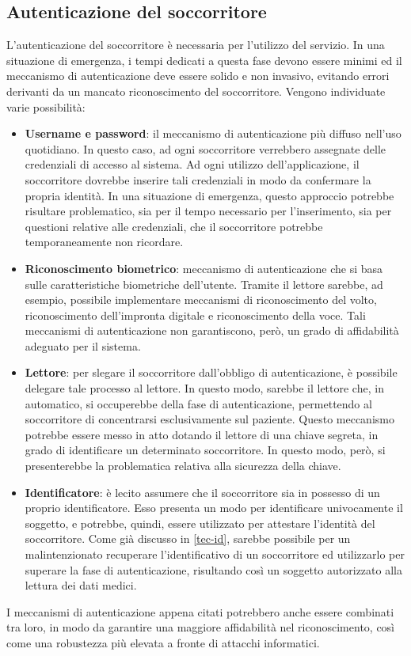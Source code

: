 \documentclass[a4paper,12pt]{report}
\begin{document}
\subsection{Autenticazione del soccorritore}
L'autenticazione del soccorritore è necessaria per l'utilizzo del servizio. In una situazione di emergenza, i tempi dedicati a questa fase devono essere minimi ed il meccanismo di autenticazione deve essere solido e non invasivo, evitando errori derivanti da un mancato riconoscimento del soccorritore. Vengono individuate varie possibilità:
\begin{itemize}
	\item \textbf{Username e password}: il meccanismo di autenticazione più diffuso nell'uso quotidiano. In questo caso, ad ogni soccorritore verrebbero assegnate delle credenziali di accesso al sistema. Ad ogni utilizzo dell'applicazione, il soccorritore dovrebbe inserire tali credenziali in modo da confermare la propria identità. In una situazione di emergenza, questo approccio potrebbe risultare problematico, sia per il tempo necessario per l'inserimento, sia per questioni relative alle credenziali, che il soccorritore potrebbe temporaneamente non ricordare.
	\item \textbf{Riconoscimento biometrico}: meccanismo di autenticazione che si basa sulle caratteristiche biometriche dell'utente. Tramite il lettore sarebbe, ad esempio, possibile implementare meccanismi di riconoscimento del volto, riconoscimento dell'impronta digitale e riconoscimento della voce. Tali meccanismi di autenticazione non garantiscono, però, un grado di affidabilità adeguato per il sistema.
	\item \textbf{Lettore}: per slegare il soccorritore dall'obbligo di autenticazione, è possibile delegare tale processo al lettore. In questo modo, sarebbe il lettore che, in automatico, si occuperebbe della fase di autenticazione, permettendo al soccorritore di concentrarsi esclusivamente sul paziente. Questo meccanismo potrebbe essere messo in atto dotando il lettore di una chiave segreta, in grado di identificare un determinato soccorritore. In questo modo, però, si presenterebbe la problematica relativa alla sicurezza della chiave.
	\item \textbf{Identificatore}: è lecito assumere che il soccorritore sia in possesso di un proprio identificatore. Esso presenta un modo per identificare univocamente il soggetto, e potrebbe, quindi, essere utilizzato per attestare l'identità del soccorritore. Come già discusso in \autoref{tec-id}, sarebbe possibile per un malintenzionato recuperare l'identificativo di un soccorritore ed utilizzarlo per superare la fase di autenticazione, risultando così un soggetto autorizzato alla lettura dei dati medici.
\end{itemize}
I meccanismi di autenticazione appena citati potrebbero anche essere combinati tra loro, in modo da garantire una maggiore affidabilità nel riconoscimento, così come una robustezza più elevata a fronte di attacchi informatici.
\end{document}
